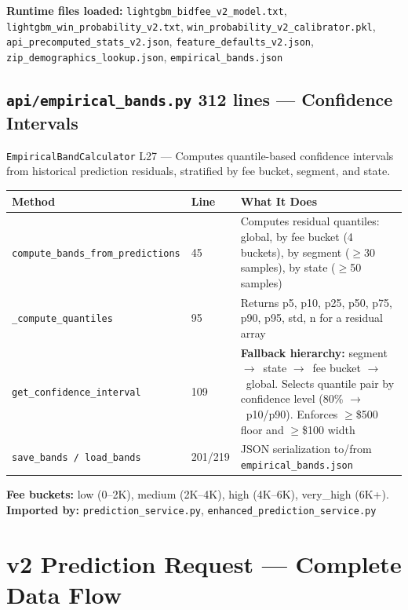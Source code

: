 \documentclass[11pt,a4paper]{article}
\newcommand{\file}[1]{\texttt{\color{gssblue!70!black}#1}}
\newcommand{\func}[1]{\texttt{\color{gssgreen!80!black}#1}}
\newcommand{\cls}[1]{\texttt{\color{uipurple}#1}}
\newcommand{\lineref}[1]{\textcolor{gssgray}{\small L#1}}
\newcommand{\arrow}{$\rightarrow$}
\newcommand{\apitag}[1]{\colorbox{apigreen!15}{\small\textcolor{apigreen}{\textbf{#1}}}}
\begin{document}
\textbf{Runtime files loaded:} \file{lightgbm\_bidfee\_v2\_model.txt}, \file{lightgbm\_win\_probability\_v2.txt}, \file{win\_probability\_v2\_calibrator.pkl}, \file{api\_precomputed\_stats\_v2.json}, \file{feature\_defaults\_v2.json}, \file{zip\_demographics\_lookup.json}, \file{empirical\_bands.json}

\subsection{\file{api/empirical\_bands.py} \apitag{312 lines} --- Confidence Intervals}

\cls{EmpiricalBandCalculator} \lineref{27} --- Computes quantile-based confidence
intervals from historical prediction residuals, stratified by fee bucket, segment, and state.

\begin{longtable}{l l p{8cm}}
\toprule
\textbf{Method} & \textbf{Line} & \textbf{What It Does} \\
\midrule
\endhead
\func{compute\_bands\_from\_predictions} & 45 & Computes residual quantiles: global, by fee bucket (4 buckets), by segment ($\geq$30 samples), by state ($\geq$50 samples) \\
\func{\_compute\_quantiles} & 95 & Returns p5, p10, p25, p50, p75, p90, p95, std, n for a residual array \\
\func{get\_confidence\_interval} & 109 & \textbf{Fallback hierarchy:} segment \arrow\ state \arrow\ fee bucket \arrow\ global. Selects quantile pair by confidence level (80\% \arrow\ p10/p90). Enforces $\geq$\$500 floor and $\geq$\$100 width \\
\func{save\_bands / load\_bands} & 201/219 & JSON serialization to/from \file{empirical\_bands.json} \\
\bottomrule
\end{longtable}

\textbf{Fee buckets:} low (0--2K), medium (2K--4K), high (4K--6K), very\_high (6K+).\\
\textbf{Imported by:} \file{prediction\_service.py}, \file{enhanced\_prediction\_service.py}

\section{v2 Prediction Request --- Complete Data Flow}
\label{sec:dataflow}
\end{document}
